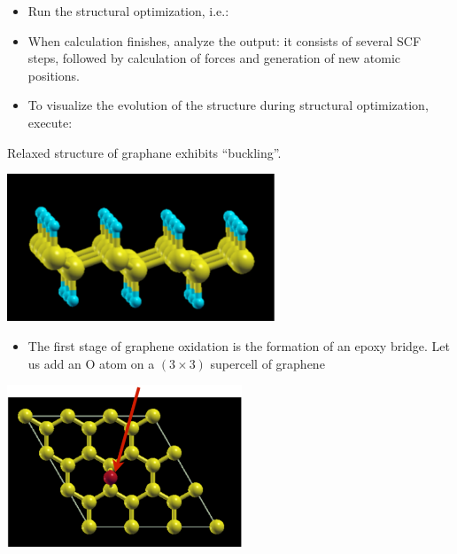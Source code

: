\documentclass[landscape]{foils}
\begin{document}
\begin{itemize}
\item Run the structural optimization, i.e.:\\[0.5em]
\item When calculation finishes, analyze the output: it consists of
   several SCF steps, followed by calculation of forces and generation
   of new atomic positions.
\item To visualize the evolution of the structure during structural
   optimization, execute:\\[1em]
\end{itemize}
\parbox{15cm}{Relaxed structure of graphane exhibits ``buckling''.}
\hskip 0.5cm \parbox{8cm}{
  \includegraphics[width=8cm]{figs/graphane2.pdf}
}


\parbox{15cm}{
  \begin{itemize}
  \item The first stage of graphene oxidation is the formation of an
    epoxy bridge. Let us add an O atom on a $(3\times3)$ supercell of
    graphene
  \end{itemize}
}\hskip 2cm\parbox{7cm}{
  \begin{flushright}
    \includegraphics[width=7cm]{figs/graphene3x3-O.pdf}    
  \end{flushright}
}
\end{document}
